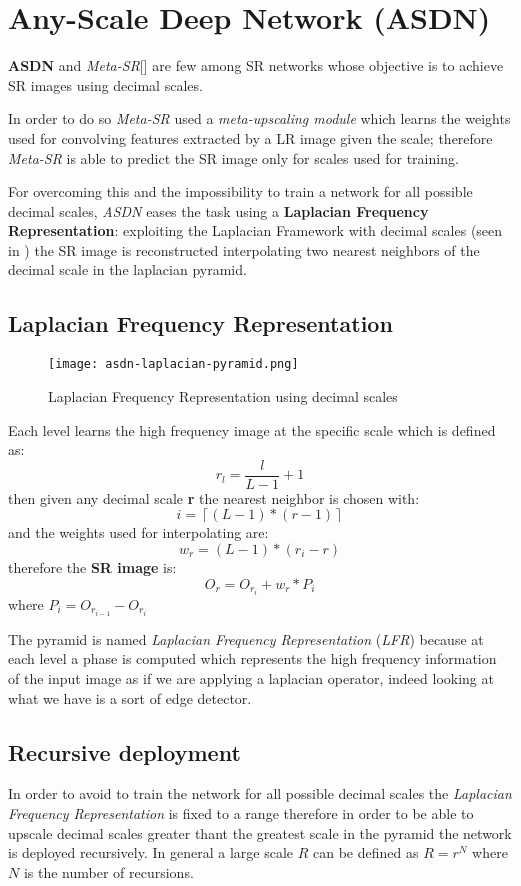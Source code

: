 \section{Any-Scale Deep Network (ASDN\cite{ASDN})}

\textbf{ASDN} and \textit{Meta-SR\cite{MetaSR}}[] are few among SR networks whose objective is to achieve SR images using decimal scales.

In order to do so \textit{Meta-SR} used a \textit{meta-upscaling module} which learns the weights used for convolving features extracted by a LR image given the scale; therefore \textit{Meta-SR}  is able to predict the SR image only for scales used for training.

For overcoming this and the impossibility to train a network for all possible decimal scales, \textit{ASDN} eases the task using a \textbf{Laplacian Frequency Representation}: exploiting the Laplacian Framework with decimal scales (seen in ) the SR image is reconstructed interpolating two nearest neighbors of the decimal scale in the laplacian pyramid.

\subsection{Laplacian Frequency Representation}
\begin{figure}
    \centering
    \texttt{[image: asdn-laplacian-pyramid.png]}
    \caption{Laplacian Frequency Representation using decimal scales}\label{asdn:lfr}
\end{figure}

Each level learns the high frequency image at the specific scale which is defined as:
$$
r_l = \frac{l}{L-1} + 1
$$
then given any decimal scale \textbf{r} the nearest neighbor is chosen with:
$$
i = \left\lceil (L-1) \ast (r-1) \right\rceil
$$
and the weights used for interpolating are:
$$
w_r  = (L-1) \ast (r_i - r)
$$
therefore the \textbf{SR image} is:
$$
O_r = O_{r_i} + w_r \ast P_i
$$
where $P_i = O_{r_{i-1}} - O_{r_i}$  

The pyramid is named \textit{Laplacian Frequency Representation} (\textit{LFR}) because at each level a phase is computed which represents the high frequency information of the input image as if we are applying a laplacian operator, indeed looking at  what we have is a sort of edge detector.

\subsection{Recursive deployment}
In order to avoid to train the network for all possible decimal scales  the \textit{Laplacian Frequency Representation} is fixed to a range therefore in order to be able to upscale decimal scales greater thant the greatest scale in the pyramid the network is deployed recursively.
In general a large scale $R$ can be defined as $R = r^N$ where $N$ is the number of recursions.

